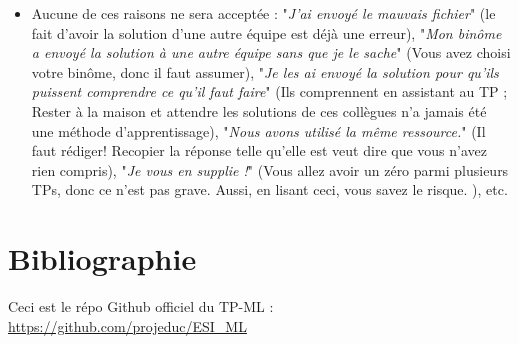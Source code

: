 \documentclass[11pt, a4paper]{article}
\begin{document}
\begin{itemize}
\begin{itemize}
		\item Aucune de ces raisons ne sera acceptée : "\textit{J'ai envoyé le mauvais fichier}" (le fait d'avoir la solution d'une autre équipe est déjà une erreur), "\textit{Mon binôme a envoyé la solution à une autre équipe sans que je le sache}" (Vous avez choisi votre binôme, donc il faut assumer), "\textit{Je les ai envoyé la solution pour qu'ils puissent comprendre ce qu'il faut faire}" (Ils comprennent en assistant au TP ; Rester à la maison et attendre les solutions de ces collègues n'a jamais été une méthode d'apprentissage), "\textit{Nous avons utilisé la même ressource.}" (Il faut rédiger! Recopier la réponse telle qu'elle est veut dire que vous n'avez rien compris), "\textit{Je vous en supplie !}" (Vous allez avoir un zéro parmi plusieurs TPs, donc ce n'est pas grave. Aussi, en lisant ceci, vous savez le risque. ), etc.
	\end{itemize}
\end{itemize}

\section{Bibliographie}

Ceci est le répo Github officiel du TP-ML : \url{https://github.com/projeduc/ESI_ML}

\nocite{*}




\end{document}
